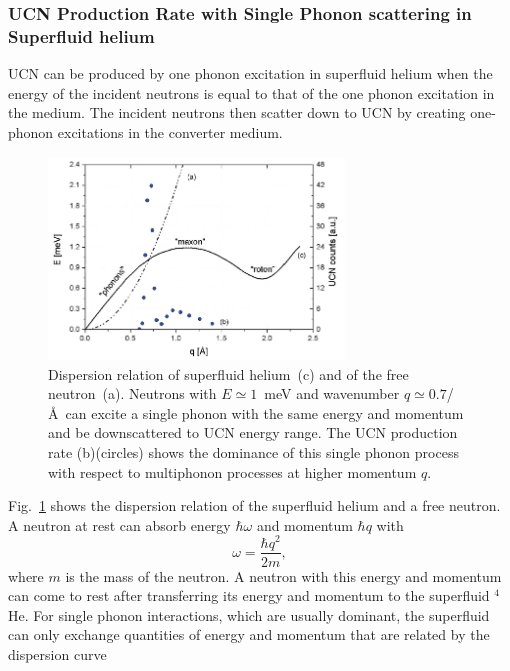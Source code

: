 \subsubsection{UCN Production Rate with Single Phonon scattering in
  Superfluid
  helium~\cite{Korobkina2002,Schmidt2009,Golub77}\label{sec:UCN_production}}
UCN can be produced by one phonon excitation in superfluid helium when
the energy of the incident neutrons is equal to that of the one phonon
excitation in the medium. The incident neutrons then scatter down to
UCN by creating one-phonon excitations in the converter medium.
\begin{figure}[h!]
\begin{center}
   \includegraphics[width=0.7\textwidth]{FIG1_2.PNG}
    \caption{\cite{PSI_news} Dispersion relation of superfluid
      helium~(c) and of the free neutron~(a). Neutrons with $E\simeq
      1$~meV and wavenumber $q \simeq 0.7$/\AA~can excite a single
      phonon with the same energy and momentum and be downscattered to
      UCN energy range. The UCN production rate (b)(circles) shows the
      dominance of this single phonon process with respect to
      multiphonon processes at higher momentum $q$.
    }
    \label{fig:FIG1}
    \end{center}
\end{figure} 
Fig.~\ref{fig:FIG1} shows the dispersion relation of the superfluid
helium and a free neutron. A neutron at rest can absorb energy $\hbar
\omega$ and momentum $\hbar q$ with
\begin{equation}
\label{neutron_energy}
\omega=\frac{\hbar q^2}{2m},
\end{equation}
where $m$ is the mass of the neutron. A neutron with this energy and momentum can
come to rest after transferring its energy and momentum to the
superfluid $^4$He. For single phonon interactions, which are usually
dominant, the superfluid can only exchange quantities of energy and
momentum that are related by the dispersion curve

